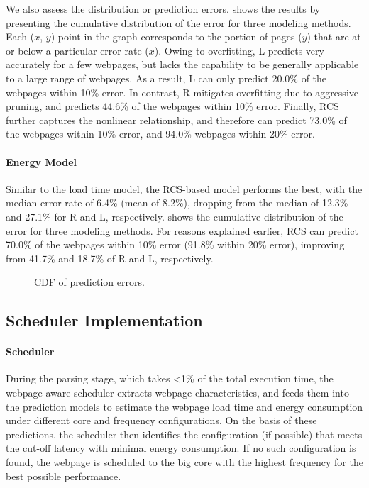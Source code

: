 We also assess the distribution or prediction errors.  shows the results by presenting the cumulative distribution of the error for three modeling methods. Each ($x$, $y$) point in the graph corresponds to the portion of pages ($y$) that are at or below a particular error rate ($x$). Owing to overfitting, L predicts very accurately for a few webpages, but lacks the capability to be generally applicable to a large range of webpages.  As a result, L can only predict 20.0\% of the webpages within 10\% error. In contrast, R mitigates overfitting due to aggressive pruning, and predicts 44.6\% of the webpages within 10\% error. Finally, RCS further captures the nonlinear relationship, and therefore can predict 73.0\% of the webpages within 10\% error, and 94.0\% webpages within 20\% error.

\paragraph{Energy Model} Similar to the load time model, the RCS-based model performs the best, with the median error rate of 6.4\% (mean of 8.2\%), dropping from the median of 12.3\% and 27.1\% for R and L, respectively.  shows the cumulative distribution of the error for three modeling methods. For reasons explained earlier, RCS can predict 70.0\% of the webpages within 10\% error (91.8\% within 20\% error), improving from 41.7\% and 18.7\% of R and L, respectively.

\begin{figure}[t]
\hspace*{15pt}
\caption{CDF of prediction errors.}
\label{fig:model_eval}
\end{figure}

\subsection{Scheduler Implementation}
\label{sec:runtime:load:sched}

\paragraph{Scheduler} During the parsing stage, which takes \textless 1\% of the total execution time, the webpage-aware scheduler extracts webpage characteristics, and feeds them into the prediction models to estimate the webpage load time and energy consumption under different core and frequency configurations.  On the basis of these predictions, the scheduler then identifies the configuration (if possible) that meets the cut-off latency with minimal energy consumption. If no such configuration is found, the webpage is scheduled to the big core with the highest frequency for the best possible performance.

